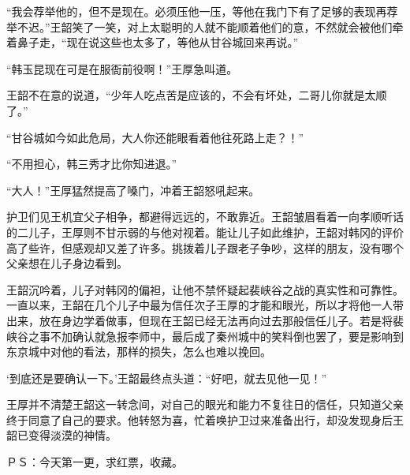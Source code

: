 “我会荐举他的，但不是现在。必须压他一压，等他在我门下有了足够的表现再荐举不迟。”王韶笑了一笑，对上太聪明的人就不能顺着他们的意，不然就会被他们牵着鼻子走，“现在说这些也太多了，等他从甘谷城回来再说。”

“韩玉昆现在可是在服衙前役啊！”王厚急叫道。

王韶不在意的说道，“少年人吃点苦是应该的，不会有坏处，二哥儿你就是太顺了。”

“甘谷城如今如此危局，大人你还能眼看着他往死路上走？！”

“不用担心，韩三秀才比你知进退。”

“大人！”王厚猛然提高了嗓门，冲着王韶怒吼起来。

护卫们见王机宜父子相争，都避得远远的，不敢靠近。王韶皱眉看着一向孝顺听话的二儿子，王厚则不甘示弱的与他对视着。能让儿子如此维护，王韶对韩冈的评价高了些许，但感观却又差了许多。挑拨着儿子跟老子争吵，这样的朋友，没有哪个父亲想在儿子身边看到。

王韶沉吟着，儿子对韩冈的偏袒，让他不禁怀疑起裴峡谷之战的真实性和可靠性。一直以来，王韶在几个儿子中最为信任次子王厚的才能和眼光，所以才将他一人带出来，放在身边学着做事，但现在王韶已经无法再向过去那般信任儿子。若是将裴峡谷之事不加确认就急报李师中，最后成了秦州城中的笑料倒也罢了，要是影响到东京城中对他的看法，那样的损失，怎么也难以挽回。

‘到底还是要确认一下。’王韶最终点头道：“好吧，就去见他一见！”

王厚并不清楚王韶这一转念间，对自己的眼光和能力不复往日的信任，只知道父亲终于同意了自己的要求。他转怒为喜，忙着唤护卫过来准备出行，却没发现身后王韶已变得淡漠的神情。

ＰＳ：今天第一更，求红票，收藏。

